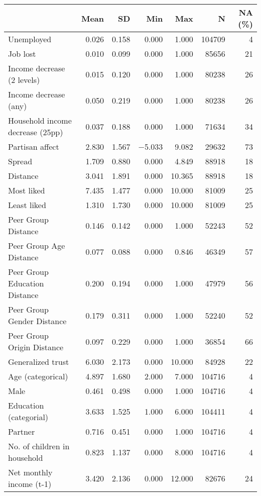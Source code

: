 \begin{table}
\centering
\begin{tabular}[t]{lrrrrrr}
\toprule
  & Mean & SD & Min & Max & N & NA (\%)\\
\midrule
Unemployed & \num{0.026} & \num{0.158} & \num{0.000} & \num{1.000} & 104709 & 4\\
Job lost & \num{0.010} & \num{0.099} & \num{0.000} & \num{1.000} & 85656 & 21\\
Income decrease (2 levels) & \num{0.015} & \num{0.120} & \num{0.000} & \num{1.000} & 80238 & 26\\
Income decrease (any) & \num{0.050} & \num{0.219} & \num{0.000} & \num{1.000} & 80238 & 26\\
Household income decrease (25pp) & \num{0.037} & \num{0.188} & \num{0.000} & \num{1.000} & 71634 & 34\\
Partisan affect & \num{2.830} & \num{1.567} & \num{-5.033} & \num{9.082} & 29632 & 73\\
Spread & \num{1.709} & \num{0.880} & \num{0.000} & \num{4.849} & 88918 & 18\\
Distance & \num{3.041} & \num{1.891} & \num{0.000} & \num{10.365} & 88918 & 18\\
Most liked & \num{7.435} & \num{1.477} & \num{0.000} & \num{10.000} & 81009 & 25\\
Least liked & \num{1.310} & \num{1.730} & \num{0.000} & \num{10.000} & 81009 & 25\\
Peer Group Distance & \num{0.146} & \num{0.142} & \num{0.000} & \num{1.000} & 52243 & 52\\
Peer Group Age Distance & \num{0.077} & \num{0.088} & \num{0.000} & \num{0.846} & 46349 & 57\\
Peer Group Education Distance & \num{0.200} & \num{0.194} & \num{0.000} & \num{1.000} & 47979 & 56\\
Peer Group Gender Distance & \num{0.179} & \num{0.311} & \num{0.000} & \num{1.000} & 52240 & 52\\
Peer Group Origin Distance & \num{0.097} & \num{0.229} & \num{0.000} & \num{1.000} & 36854 & 66\\
Generalized trust & \num{6.030} & \num{2.173} & \num{0.000} & \num{10.000} & 84928 & 22\\
Age (categorical) & \num{4.897} & \num{1.680} & \num{2.000} & \num{7.000} & 104716 & 4\\
Male & \num{0.461} & \num{0.498} & \num{0.000} & \num{1.000} & 104716 & 4\\
Education (categorial) & \num{3.633} & \num{1.525} & \num{1.000} & \num{6.000} & 104411 & 4\\
Partner & \num{0.716} & \num{0.451} & \num{0.000} & \num{1.000} & 104716 & 4\\
No. of children in household & \num{0.823} & \num{1.137} & \num{0.000} & \num{8.000} & 104716 & 4\\
Net monthly income (t-1) & \num{3.420} & \num{2.136} & \num{0.000} & \num{12.000} & 82676 & 24\\
\bottomrule
\end{tabular}
\end{table}
